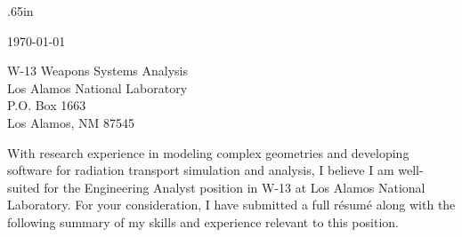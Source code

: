 \documentclass[a4paper,10pt]{article}
\begin{document}
\pagestyle{empty} 		%
\sloppy 			%


\vspace{5mm}


  \normalsize
  
  \begingroup
  \leftskip.65in
  \rightskip\leftskip

  \vspace{4mm} 
  \today \\
  \vspace{2mm}

W-13 Weapons Systems Analysis\\
Los Alamos National Laboratory \\
P.O. Box 1663 \\
Los Alamos, NM 87545
  
  \vspace{4mm} 

With research experience in modeling complex geometries and developing
software for radiation transport simulation and analysis, I believe I am
well-suited for the Engineering Analyst position in W-13
at Los Alamos National Laboratory.
For your consideration, I have submitted a full r\'{e}sum\'{e} along with
the following summary of my skills and
experience relevant to this position.


\end{document}
